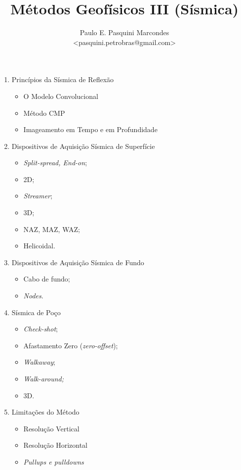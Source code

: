 \documentclass[a4paper,11pt]{scrartcl}
\title{M\'etodos Geof\'isicos III (S\'ismica)}
\author{Paulo E. Pasquini Marcondes \\<pasquini.petrobras@gmail.com>}
\begin{document}
\maketitle


\begin{enumerate}
\item Princ\'ipios da S\'ismica de Reflex\~ao
	\begin{itemize}
	\item O Modelo Convolucional
	\item M\'etodo CMP 
	\item Imageamento em Tempo e em Profundidade
	\end{itemize}
\item Dispositivos de Aquisi\c{c}\~ao S\'ismica de Superf\'icie
	\begin{itemize}
	\item \emph{Split-spread, End-on};
	\item 2D;
	\item \emph{Streamer};
	\item 3D;
	\item NAZ, MAZ, WAZ;
	\item Helicoidal.
	\end{itemize}
\item Dispositivos de Aquisi\c{c}\~ao S\'ismica de Fundo
	\begin{itemize}
	\item Cabo de fundo;
	\item \emph{Nodes}.
	\end{itemize}
\item S\'ismica de Po\c{c}o
	\begin{itemize}
	\item \emph{Check-shot};
	\item Afastamento Zero (\emph{zero-offset});
	\item \emph{Walkaway};
	\item \emph{Walk-around;}
	\item 3D.
	\end{itemize}
\item Limita\c{c}\~oes do M\'etodo
	\begin{itemize}
	\item Resolu\c{c}\~ao Vertical
	\item Resolu\c{c}\~ao Horizontal
	\item \emph{Pullups e pulldowns}

\end{itemize}
\end{enumerate}
\end{document}
